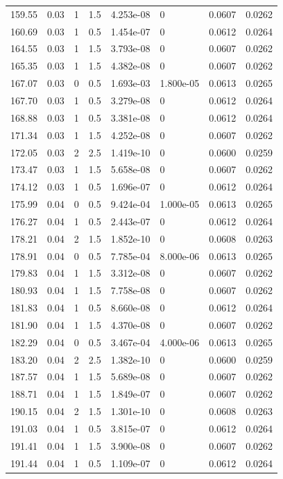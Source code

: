 \documentclass[preview]{standalone}
\begin{document}
{{{\begin{tabular}{L{1.2cm}C{1.2cm} C{0.3cm}C{0.5cm} C{1.4cm}C{1.4cm} C{1.4cm}C{1.4cm}}
  159.55  &  0.03  & 1     & 1.5 &  4.253e-08  & 0  & 0.0607 &  0.0262   \\ 
  160.69  &  0.03  & 1     & 0.5 &  1.454e-07  & 0  & 0.0612 &  0.0264   \\ 
  164.55  &  0.03  & 1     & 1.5 &  3.793e-08  & 0  & 0.0607 &  0.0262   \\ 
  165.35  &  0.03  & 1     & 1.5 &  4.382e-08  & 0  & 0.0607 &  0.0262   \\ 
  167.07  &  0.03  & 0     & 0.5 &  1.693e-03  & 1.800e-05  & 0.0613 &  0.0265   \\ 
  167.70  &  0.03  & 1     & 0.5 &  3.279e-08  & 0  & 0.0612 &  0.0264   \\ 
  168.88  &  0.03  & 1     & 0.5 &  3.381e-08  & 0  & 0.0612 &  0.0264   \\ 
  171.34  &  0.03  & 1     & 1.5 &  4.252e-08  & 0  & 0.0607 &  0.0262   \\ 
  172.05  &  0.03  & 2     & 2.5 &  1.419e-10  & 0  & 0.0600 &  0.0259   \\ 
  173.47  &  0.03  & 1     & 1.5 &  5.658e-08  & 0  & 0.0607 &  0.0262   \\ 
  174.12  &  0.03  & 1     & 0.5 &  1.696e-07  & 0  & 0.0612 &  0.0264   \\ 
  175.99  &  0.04  & 0     & 0.5 &  9.424e-04  & 1.000e-05  & 0.0613 &  0.0265   \\ 
  176.27  &  0.04  & 1     & 0.5 &  2.443e-07  & 0  & 0.0612 &  0.0264   \\ 
  178.21  &  0.04  & 2     & 1.5 &  1.852e-10  & 0  & 0.0608 &  0.0263   \\ 
  178.91  &  0.04  & 0     & 0.5 &  7.785e-04  & 8.000e-06  & 0.0613 &  0.0265   \\ 
  179.83  &  0.04  & 1     & 1.5 &  3.312e-08  & 0  & 0.0607 &  0.0262   \\ 
  180.93  &  0.04  & 1     & 1.5 &  7.758e-08  & 0  & 0.0607 &  0.0262   \\ 
  181.83  &  0.04  & 1     & 0.5 &  8.660e-08  & 0  & 0.0612 &  0.0264   \\ 
  181.90  &  0.04  & 1     & 1.5 &  4.370e-08  & 0  & 0.0607 &  0.0262   \\ 
  182.29  &  0.04  & 0     & 0.5 &  3.467e-04  & 4.000e-06  & 0.0613 &  0.0265   \\ 
  183.20  &  0.04  & 2     & 2.5 &  1.382e-10  & 0  & 0.0600 &  0.0259   \\ 
  187.57  &  0.04  & 1     & 1.5 &  5.689e-08  & 0  & 0.0607 &  0.0262   \\ 
  188.71  &  0.04  & 1     & 1.5 &  1.849e-07  & 0  & 0.0607 &  0.0262   \\ 
  190.15  &  0.04  & 2     & 1.5 &  1.301e-10  & 0  & 0.0608 &  0.0263   \\ 
  191.03  &  0.04  & 1     & 0.5 &  3.815e-07  & 0  & 0.0612 &  0.0264   \\ 
  191.41  &  0.04  & 1     & 1.5 &  3.900e-08  & 0  & 0.0607 &  0.0262   \\ 
  191.44  &  0.04  & 1     & 0.5 &  1.109e-07  & 0  & 0.0612 &  0.0264   \\ 
\hline 
\end{tabular} 

}}}
\end{document}

